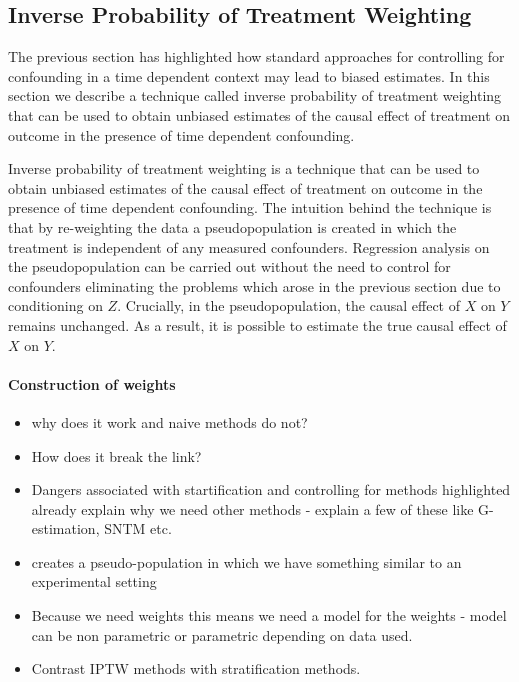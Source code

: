\documentclass[11pt]{article}
\providecommand{\tightlist}{%
      \setlength{\itemsep}{0pt}\setlength{\parskip}{0pt}}
\begin{document}
    \subsection{Inverse Probability of Treatment
Weighting}\label{inverse-probability-of-treatment-weighting}

The previous section has highlighted how standard approaches for
controlling for confounding in a time dependent context may lead to
biased estimates. In this section we describe a technique called inverse
probability of treatment weighting that can be used to obtain unbiased
estimates of the causal effect of treatment on outcome in the presence
of time dependent confounding.

Inverse probability of treatment weighting is a technique that can be
used to obtain unbiased estimates of the causal effect of treatment on
outcome in the presence of time dependent confounding. The intuition
behind the technique is that by re-weighting the data a pseudopopulation
is created in which the treatment is independent of any measured
confounders. Regression analysis on the pseudopopulation can be carried
out without the need to control for confounders eliminating the problems
which arose in the previous section due to conditioning on \(Z\).
Crucially, in the pseudopopulation, the causal effect of \(X\) on \(Y\)
remains unchanged. As a result, it is possible to estimate the true
causal effect of \(X\) on \(Y\).

\paragraph{Construction of weights}\label{construction-of-weights}

\begin{itemize}
\tightlist
\item
  why does it work and naive methods do not?
\item
  How does it break the link?
\item
  Dangers associated with startification and controlling for methods
  highlighted already explain why we need other methods - explain a few
  of these like G-estimation, SNTM etc.
\item
  creates a pseudo-population in which we have something similar to an
  experimental setting
\item
  Because we need weights this means we need a model for the weights -
  model can be non parametric or parametric depending on data used.
\item
  Contrast IPTW methods with stratification methods.
\end{itemize}
\end{document}
